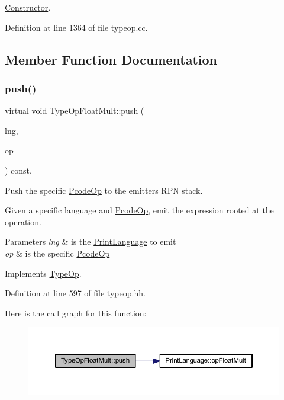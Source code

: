 \mbox{\hyperlink{class_constructor}{Constructor}}. 



Definition at line 1364 of file typeop.\+cc.



\subsection{Member Function Documentation}
\mbox{\label{class_type_op_float_mult_a23ffc0427d8f7e28b069084946a61f3f}} 
\subsubsection{\texorpdfstring{push()}{push()}}
{\footnotesize\ttfamily virtual void Type\+Op\+Float\+Mult\+::push (\begin{DoxyParamCaption}\item[{\mbox{\hyperlink{class_print_language}{Print\+Language}} $\ast$}]{lng,  }\item[{const \mbox{\hyperlink{class_pcode_op}{Pcode\+Op}} $\ast$}]{op }\end{DoxyParamCaption}) const\hspace{0.3cm}{\ttfamily [inline]}, {\ttfamily [virtual]}}



Push the specific \mbox{\hyperlink{class_pcode_op}{Pcode\+Op}} to the emitter\textquotesingle{}s R\+PN stack. 

Given a specific language and \mbox{\hyperlink{class_pcode_op}{Pcode\+Op}}, emit the expression rooted at the operation. 
\begin{DoxyParams}{Parameters}
{\em lng} & is the \mbox{\hyperlink{class_print_language}{Print\+Language}} to emit \\
\hline
{\em op} & is the specific \mbox{\hyperlink{class_pcode_op}{Pcode\+Op}} \\
\hline
\end{DoxyParams}


Implements \mbox{\hyperlink{class_type_op_ac9c9544203ed74dabe6ac662b653b2af}{Type\+Op}}.



Definition at line 597 of file typeop.\+hh.

Here is the call graph for this function\+:
\nopagebreak
\begin{figure}[H]
\begin{center}
\leavevmode
\includegraphics[width=350pt]{class_type_op_float_mult_a23ffc0427d8f7e28b069084946a61f3f_cgraph}
\end{center}
\end{figure}


